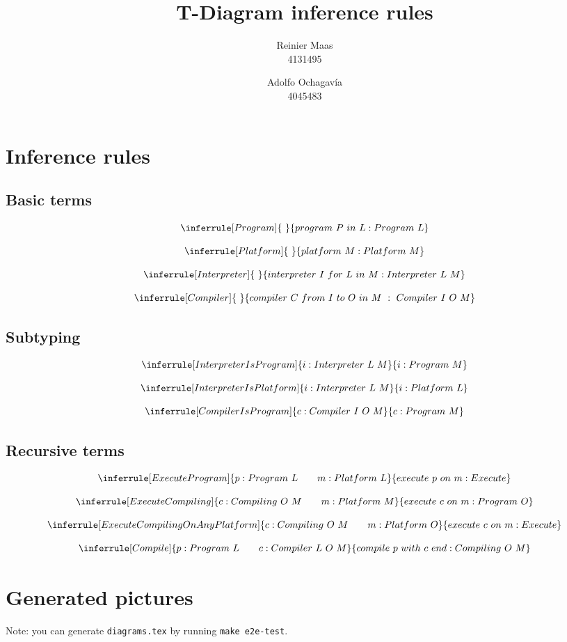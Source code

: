 \documentclass{article}
\author{
  Reinier Maas \\ 4131495
  \and
  Adolfo Ochagavía \\ 4045483
}
\title{T-Diagram inference rules}
\begin{document}
\maketitle


\section{Inference rules}

\subsection*{Basic terms}

\[
\inferrule[Program]{\ }{program\ P\ in\ L : Program\ L}
\]

\[
\inferrule[Platform]{\ }{platform\ M : Platform\ M}
\]

\[
\inferrule[Interpreter]{\ }{interpreter\ I\ for\ L\ in\ M : Interpreter\ L\ M}
\]

\[
\inferrule[Compiler]{\ }{compiler\ C\ from\ I\ to\ O\ in\ M\ :\ Compiler\ I\ O\ M}
\]

\subsection*{Subtyping}

\[
\inferrule[InterpreterIsProgram]{i : Interpreter\ L\ M}{i : Program\ M}
\]

\[
\inferrule[InterpreterIsPlatform]{i : Interpreter\ L\ M}{i : Platform\ L}
\]

\[
\inferrule[CompilerIsProgram]{c : Compiler\ I\ O\ M}{c : Program\ M}
\]

\subsection*{Recursive terms}

\[
\inferrule[ExecuteProgram]{p : Program\ L \qquad m : Platform\ L}{execute\ p\ on\ m : Execute}
\]

\[
\inferrule[ExecuteCompiling]{c : Compiling\ O\ M \qquad m : Platform\ M}{execute\ c\ on\ m : Program\ O}
\]

\[
\inferrule[ExecuteCompilingOnAnyPlatform]{c : Compiling\ O\ M \qquad m : Platform\ O}{execute\ c\ on\ m : Execute}
\]

\[
\inferrule[Compile]{p : Program\ L \qquad c : Compiler\ L\ O\ M}{compile\ p\ with\ c\ end : Compiling\ O\ M}
\]

\section{Generated pictures}

Note: you can generate \texttt{diagrams.tex} by running \texttt{make e2e-test}.


\end{document}
